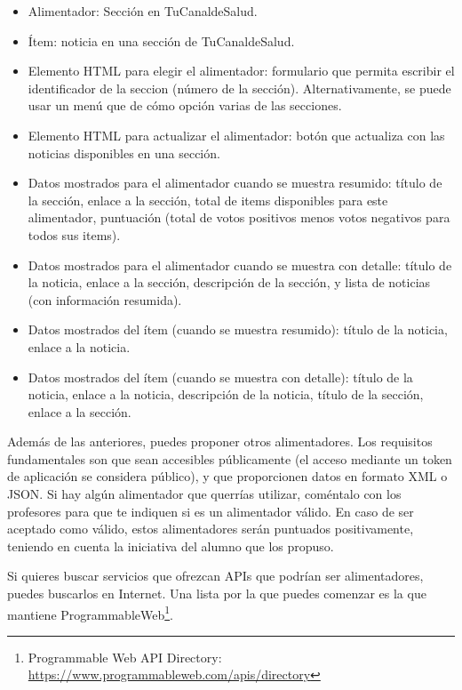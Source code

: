 \begin{itemize}
  \begin{itemize}
  \item Alimentador: Sección en TuCanaldeSalud.
  \item Ítem: noticia en una sección de TuCanaldeSalud.
  \item Elemento HTML para elegir el alimentador: formulario que permita escribir el identificador de la seccion (número de la sección). Alternativamente, se puede usar un menú que de cómo opción varias de las secciones.
  \item Elemento HTML para actualizar el alimentador: botón que actualiza con las noticias disponibles en una sección.
  \item Datos mostrados para el alimentador cuando se muestra resumido: título de la sección, enlace a la sección, total de items disponibles para este alimentador, puntuación (total de votos positivos menos votos negativos para todos sus items).
  \item Datos mostrados para el alimentador cuando se muestra con detalle: título de la noticia, enlace a la sección, descripción de la sección, y lista de noticias (con información resumida).
  \item Datos mostrados del ítem (cuando se muestra resumido): título de la noticia, enlace a la noticia.
  \item Datos mostrados del ítem (cuando se muestra con detalle): título de la noticia, enlace a la noticia, descripción de la noticia, título de la sección, enlace a la sección.
  \end{itemize} 
\end{itemize}

Además de las anteriores, puedes proponer otros alimentadores. Los requisitos fundamentales son que sean accesibles públicamente (el acceso mediante un token de aplicación se considera público), y que proporcionen datos en formato XML o JSON. Si hay algún alimentador que querrías utilizar, coméntalo con los profesores para que te indiquen si es un alimentador válido. En caso de ser aceptado como válido, estos alimentadores serán puntuados positivamente, teniendo en cuenta la iniciativa del alumno que los propuso.

Si quieres buscar servicios que ofrezcan APIs que podrían ser alimentadores, puedes buscarlos en Internet. Una lista por la que puedes comenzar es la que mantiene ProgrammableWeb\footnote{Programmable Web API Directory: \\\url{https://www.programmableweb.com/apis/directory}}.

